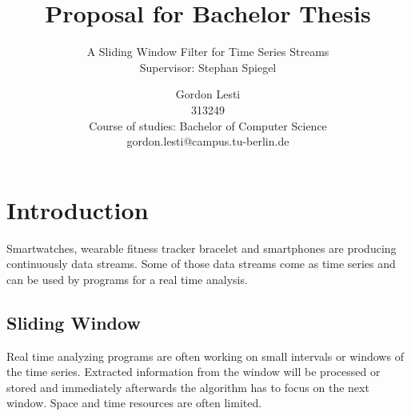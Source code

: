 \documentclass[runningheads,a4paper]{llncs}
\begin{document}
    \graphicspath{ {../img/} }
    \mainmatter

    \title{Proposal for Bachelor Thesis}
    \subtitle{A Sliding Window Filter for Time Series Streams\\
    \textnormal{\small{Supervisor: Stephan Spiegel\\\vspace{1\baselineskip}}}}


    \author{Gordon Lesti\\313249\\Course of studies: Bachelor of Computer Science\\gordon.lesti@campus.tu-berlin.de\\\vspace{5\baselineskip}}



    \maketitle

    \section{Introduction}
    Smartwatches, wearable fitness tracker bracelet and smartphones are producing continuously data streams. Some of
    those data streams come as time series and can be used by programs for a real time analysis.

    \subsection{Sliding Window}
    Real time analyzing programs are often working on small intervals or windows of the time series. Extracted
    information from the window will be processed or stored and immediately afterwards the algorithm has to focus on the
    next window. Space and time resources are often limited.
\end{document}

